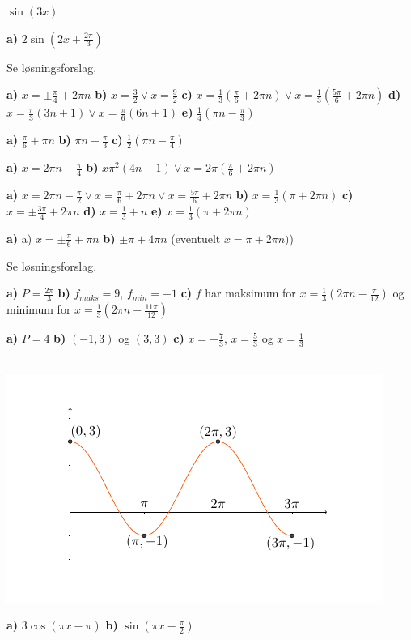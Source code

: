  $ \sin(3x) $

 \textbf{a)} $2\sin\left(2x+\frac{2\pi}{3}\right)  $ 

 Se løsningsforslag.

 \textbf{a)} $ x = \pm \frac{\pi}{4}+2\pi n $ \textbf{b)} $ x=\frac{3}{2} \vee x = \frac{9}{2} $ \textbf{c)} $ x=\frac{1}{3}(\frac{\pi}{6}+2\pi n)\vee x= \frac{1}{3}(\frac{5\pi}{6}+2\pi n) $ \textbf{d)} $ x=\frac{\pi}{3}(3n+1)\vee x= \frac{\pi}{6}(6 n+1)$ \textbf{e)} $\frac{1}{4}(\pi n-\frac{\pi}{3} )$

 \textbf{a)} $ \frac{\pi}{6}+\pi n $ \textbf{b)} $ \pi n-\frac{\pi}{3} $ \textbf{c)} $ \frac{1}{2}\left(\pi n-\frac{\pi}{4}\right) $

\textbf{a)} $ x=2\pi n-\frac{\pi}{4} $
\textbf{b)} $ x\pi^2(4n-1)\vee x=2\pi\left(\frac{\pi}{6}+2\pi n\right) $ 

\textbf{a)} ${ x= 2\pi n-\frac{\pi}{2} \vee x = \frac{\pi}{6}+2\pi n \vee x = \frac{5\pi}{6}+2\pi n}$ \textbf{b)} ${ x=\frac{1}{3}(\pi +2\pi n) }$ \textbf{c)} ${ x = \pm \frac{3\pi}{4}+2\pi n  }$ \textbf{d)} ${ x=\frac{1}{3}+n }$ \textbf{e)} ${ x=\frac{1}{3}(\pi +2\pi n) }$

\textbf{a)} a) $ x = \pm \frac{\pi}{6}+\pi n $ \textbf{b)} $ \pm \pi + 4\pi n$ (eventuelt $ x=\pi +2\pi n) $)

 Se løsningsforslag.

 \textbf{a)} $ P = \frac{2\pi}{3} $ \textbf{b)} $ f_{maks}=9 $, $ f_{min}=-1 $ \textbf{c)} $ f $ har maksimum for $ x= \frac{1}{3}\left(2\pi n-\frac{\pi}{12}\right) $ og minimum for $ x=\frac{1}{3}(2\pi n-\frac{11\pi}{12}) $

 \textbf{a)} $ P=4 $ \textbf{b)} $ (-1, 3) $ og $ (3, 3) $ \textbf{c)}  $ x=-\frac{7}{3} $, $ x=\frac{5}{3} $ og $ x=\frac{1}{3} $

\\
\vs
\includegraphics[]{skissin}\vs

\textbf{a)} $ 3\cos(\pi x - \pi) $ \textbf{b)} $ \sin\left(\pi x-\frac{\pi}{2}\right) $





